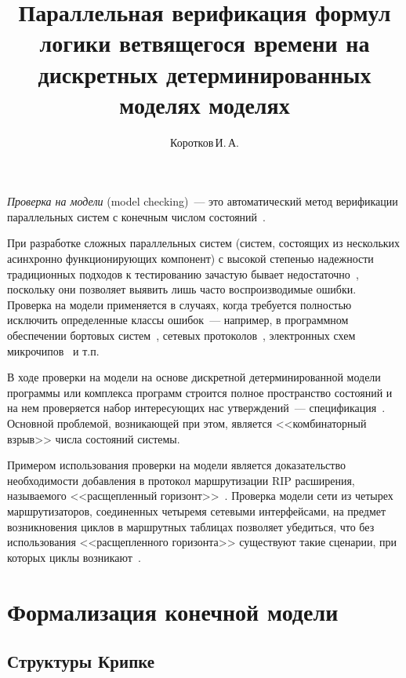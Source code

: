 \documentclass[a4paper,notitlepage,14pt]{article}
\title{Параллельная верификация формул логики ветвящегося времени на дискретных
  детерминированных моделях моделях} \author{Коротков\,И.\,А.}
\begin{document}
\maketitle

\emph{Проверка на модели} (model checking)~--- это автоматический метод верификации
параллельных систем с конечным числом состояний~\cite{Clarke}.

При разработке сложных параллельных систем (систем, состоящих из нескольких асинхронно
функционирующих компонент) с высокой степенью надежности традиционных подходов к
тестированию зачастую бывает недостаточно~\cite{Clarke}, поскольку они позволяет выявить
лишь часто воспроизводимые ошибки. Проверка на модели применяется в случаях, когда
требуется полностью исключить определенные классы ошибок~--- например, в программном
обеспечении бортовых систем~\cite{Havelund98formalanalysis,CamaraArincModel}, сетевых
протоколов~\cite{RipOnSpin}, электронных схем микрочипов~\cite{Glazberg_psl:beyond} и т.п.

В ходе проверки на модели на основе дискретной детерминированной модели программы или
комплекса программ строится полное пространство состояний и на нем проверяется набор
интересующих нас утверждений~--- спецификация~\cite{Velder}. Основной проблемой,
возникающей при этом, является <<комбинаторный взрыв>> числа состояний
системы\cite{Clarke}.

Примером использования проверки на модели является доказательство необходимости добавления
в протокол маршрутизации RIP расширения, называемого <<расщепленный
горизонт>>~\cite{Black00:IP}. Проверка модели сети из четырех маршрутизаторов, соединенных
четыремя сетевыми интерфейсами, на предмет возникновения циклов в маршрутных таблицах
позволяет убедиться, что без использования <<расщепленного горизонта>> существуют такие
сценарии, при которых циклы возникают~\cite{RipOnSpin}.


\section{Формализация конечной модели}
\label{sec:modelchecking}

\subsection{Структуры Крипке}
\label{sec:kripke}
\end{document}
